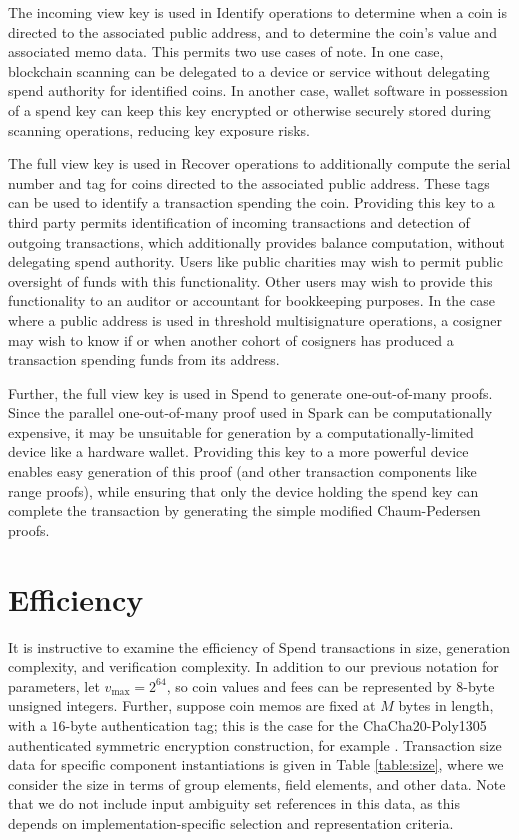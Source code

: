 \documentclass{llncs}
\begin{document}
The incoming view key is used in $\text{Identify}$ operations to determine when a coin is directed to the associated public address, and to determine the coin's value and associated memo data.
This permits two use cases of note.
In one case, blockchain scanning can be delegated to a device or service without delegating spend authority for identified coins.
In another case, wallet software in possession of a spend key can keep this key encrypted or otherwise securely stored during scanning operations, reducing key exposure risks.

The full view key is used in $\text{Recover}$ operations to additionally compute the serial number and tag for coins directed to the associated public address.
These tags can be used to identify a transaction spending the coin.
Providing this key to a third party permits identification of incoming transactions and detection of outgoing transactions, which additionally provides balance computation, without delegating spend authority.
Users like public charities may wish to permit public oversight of funds with this functionality.
Other users may wish to provide this functionality to an auditor or accountant for bookkeeping purposes.
In the case where a public address is used in threshold multisignature operations, a cosigner may wish to know if or when another cohort of cosigners has produced a transaction spending funds from its address.

Further, the full view key is used in $\text{Spend}$ to generate one-out-of-many proofs.
Since the parallel one-out-of-many proof used in Spark can be computationally expensive, it may be unsuitable for generation by a computationally-limited device like a hardware wallet.
Providing this key to a more powerful device enables easy generation of this proof (and other transaction components like range proofs), while ensuring that only the device holding the spend key can complete the transaction by generating the simple modified Chaum-Pedersen proofs.


\section{Efficiency}

It is instructive to examine the efficiency of $\text{Spend}$ transactions in size, generation complexity, and verification complexity.
In addition to our previous notation for parameters, let $v_{\text{max}} = 2^{64}$, so coin values and fees can be represented by $8$-byte unsigned integers.
Further, suppose coin memos are fixed at $M$ bytes in length, with a $16$-byte authentication tag; this is the case for the ChaCha20-Poly1305 authenticated symmetric encryption construction, for example \cite{chachapoly}.
Transaction size data for specific component instantiations is given in Table \ref{table:size}, where we consider the size in terms of group elements, field elements, and other data.
Note that we do not include input ambiguity set references in this data, as this depends on implementation-specific selection and representation criteria.
\end{document}
